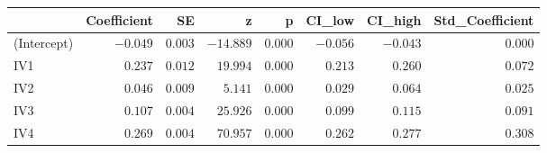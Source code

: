 \begin{longtable}{l|rrrrrrr}
\toprule
\multicolumn{1}{l}{} & Coefficient & SE & z & p & CI\_low & CI\_high & Std\_Coefficient \\ 
\midrule
(Intercept) & $-0.049$ & $0.003$ & $-14.889$ & $0.000$ & $-0.056$ & $-0.043$ & $0.000$ \\ 
IV1 & $0.237$ & $0.012$ & $19.994$ & $0.000$ & $0.213$ & $0.260$ & $0.072$ \\ 
IV2 & $0.046$ & $0.009$ & $5.141$ & $0.000$ & $0.029$ & $0.064$ & $0.025$ \\ 
IV3 & $0.107$ & $0.004$ & $25.926$ & $0.000$ & $0.099$ & $0.115$ & $0.091$ \\ 
IV4 & $0.269$ & $0.004$ & $70.957$ & $0.000$ & $0.262$ & $0.277$ & $0.308$ \\ 
\bottomrule
\end{longtable}

